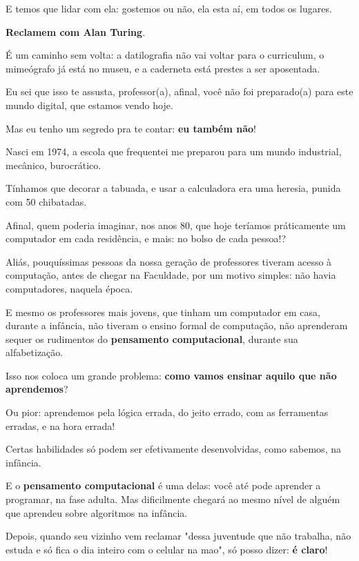 \begin{multicols}{2}
E temos que lidar com ela: gostemos ou não, ela esta aí, em todos os lugares.

\textbf{Reclamem com Alan Turing}.

É um caminho sem volta: a datilografia não vai voltar para o curriculum, o mimeógrafo já está no museu, e a caderneta está prestes a ser aposentada.

Eu sei que isso te assusta, professor(a), afinal, você não foi preparado(a) para este mundo digital, que estamos vendo hoje.

Mas eu tenho um segredo pra te contar: \textbf{eu também não}!

Nasci em 1974, a escola que frequentei me preparou para um mundo industrial, mecânico, burocrático.

Tínhamos que decorar a tabuada, e usar a calculadora era uma heresia, punida com 50 chibatadas.

Afinal, quem poderia imaginar, nos anos 80, que hoje teríamos práticamente um computador em cada residência, e mais: no bolso de cada pessoa!?

Aliás, pouquíssimas pessoas da nossa geração de professores tiveram acesso à computação, antes de chegar na Faculdade, por um motivo simples: não havia computadores, naquela época.

E mesmo os professores mais jovens, que tinham um computador em casa, durante a infância, não tiveram o ensino formal de computação, não aprenderam sequer os rudimentos do \textbf{pensamento computacional}, durante sua alfabetização.

Isso nos coloca um grande problema: \textbf{como vamos ensinar aquilo que não aprendemos}?

%

Ou pior: aprendemos pela lógica errada, do jeito errado, com as ferramentas erradas, e na hora errada!

Certas habilidades só podem ser efetivamente desenvolvidas, como sabemos, na infância.

E o \textbf{pensamento computacional} é uma delas: você até pode aprender a programar, na fase adulta. Mas dificilmente chegará ao mesmo nível de alguém que aprendeu sobre algoritmos na infância.

Depois, quando seu vizinho vem reclamar "dessa juventude que não trabalha, não estuda e só fica o dia inteiro com o celular na mao", só posso dizer: \textbf{é claro}!


\end{multicols}
